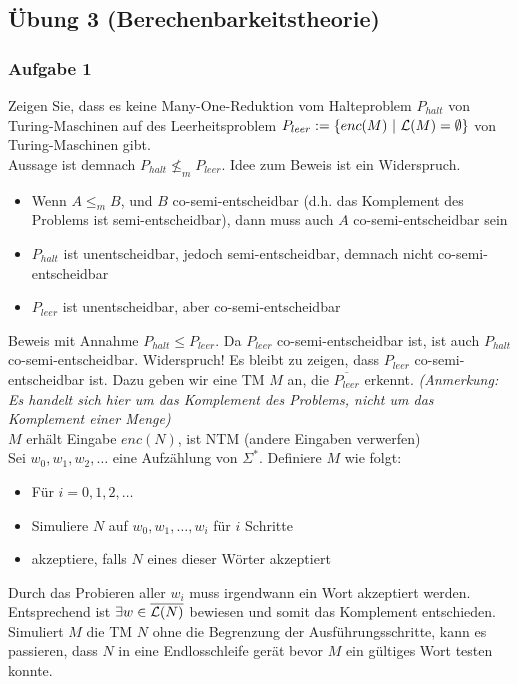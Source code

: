\subsection*{Übung 3 (Berechenbarkeitstheorie)}
\subsubsection*{Aufgabe 1}
    Zeigen Sie, dass es keine Many-One-Reduktion vom Halteproblem $P_{halt}$ von Turing-Maschinen auf des Leerheitsproblem $P_{leer} := \{enc(M)\ |\ \mathcal{L}(M) = \emptyset\}$ von Turing-Maschinen gibt. \\

    \LOES Aussage ist demnach $P_{halt} \not\leq_{m} P_{leer}$. Idee zum Beweis ist ein Widerspruch.
    \begin{itemize}
        \item Wenn $A \leq_{m} B$, und $B$ co-semi-entscheidbar (d.h. das Komplement des Problems ist semi-entscheidbar), dann muss auch $A$ co-semi-entscheidbar sein
        \item $P_{halt}$ ist unentscheidbar, jedoch semi-entscheidbar, demnach nicht co-semi-entscheidbar
        \item $P_{leer}$ ist unentscheidbar, aber co-semi-entscheidbar
    \end{itemize}
    Beweis mit Annahme $P_{halt} \leq P_{leer}$. Da $P_{leer}$ co-semi-entscheidbar ist, ist auch $P_{halt}$ co-semi-entscheidbar. Widerspruch!
    Es bleibt zu zeigen, dass $P_{leer}$ co-semi-entscheidbar ist. Dazu geben wir eine TM $M$ an, die $\overline{P_{leer}}$ erkennt. \textit{(Anmerkung: Es handelt sich hier um das Komplement des Problems, nicht um das Komplement einer Menge)} \\

\newpage
    $M$ erhält Eingabe $enc(N)$, ist NTM (andere Eingaben verwerfen) \\
    Sei $w_{0}, w_{1}, w_{2}, \dots$ eine Aufzählung von $\Sigma^{*}$. Definiere $M$ wie folgt:
    \begin{itemize}
        \item Für $i = 0, 1, 2, \dots${}
        \item Simuliere $N$ auf $w_{0}, w_{1}, \dots, w_{i}$ für $i$ Schritte
        \item akzeptiere, falls $N$ eines dieser Wörter akzeptiert
    \end{itemize}
    Durch das Probieren aller $w_{i}$ muss irgendwann ein Wort akzeptiert werden. Entsprechend ist $\exists w \in \overline{\mathcal{L}(N)}$ bewiesen und somit das Komplement entschieden. \\
    Simuliert $M$ die TM $N$ ohne die Begrenzung der Ausführungsschritte, kann es passieren, dass $N$ in eine Endlosschleife gerät bevor $M$ ein gültiges Wort testen konnte.


